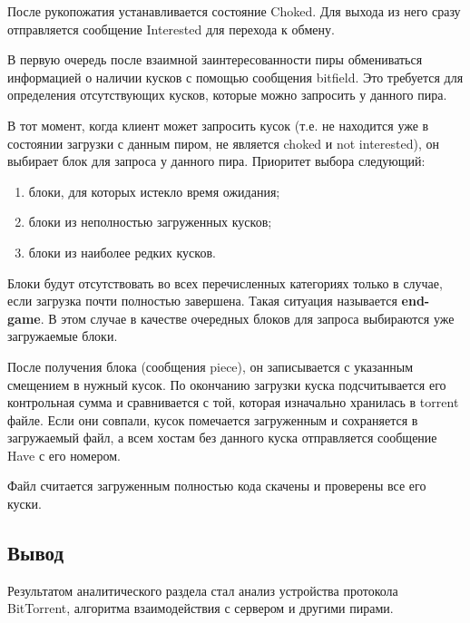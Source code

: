После рукопожатия устанавливается состояние Choked. Для выхода из него сразу отправляется сообщение Interested для перехода к обмену.

В первую очередь после взаимной заинтересованности пиры обмениваться информацией о наличии кусков с помощью сообщения bitfield. Это требуется для определения отсутствующих кусков, которые можно запросить у данного пира. 

В тот момент, когда клиент может запросить кусок (т.е. не находится уже в состоянии загрузки с данным пиром, не является choked и not interested), он выбирает блок для запроса у данного пира. Приоритет выбора следующий:
\begin{enumerate}
	\item блоки, для которых истекло время ожидания;
	
	\item блоки из неполностью загруженных кусков;
	
	\item блоки из наиболее редких кусков. \\
\end{enumerate}

Блоки будут отсутствовать во всех перечисленных категориях только в случае, если загрузка почти полностью завершена. Такая ситуация называется \textbf{end-game}. В этом случае в качестве очередных блоков для запроса выбираются уже загружаемые блоки.

После получения блока (сообщения piece), он записывается с указанным смещением в нужный кусок. По окончанию загрузки куска подсчитывается его контрольная сумма и сравнивается с той, которая изначально хранилась в torrent файле. Если они совпали, кусок помечается загруженным и сохраняется в загружаемый файл, а всем хостам без данного куска отправляется сообщение Have с его номером.

Файл считается загруженным полностью кода скачены и проверены все его куски. \newline

\subsection*{Вывод}
Результатом аналитического раздела стал анализ устройства протокола BitTorrent, алгоритма взаимодействия с сервером и другими пирами.
